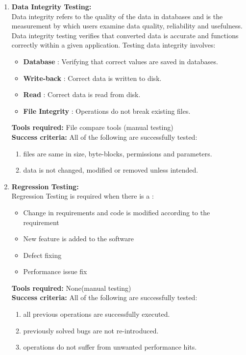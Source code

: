 \begin{enumerate}
\item \textbf{Data Integrity Testing:} \\
Data integrity refers to the quality of the data in databases and is the measurement by which users examine data quality, reliability and usefulness. Data integrity testing verifies that converted data is accurate and functions correctly within a given application. Testing data integrity involves:
\begin{itemize}
\item \textbf{Database} : Verifying that correct values are saved in databases.
\item \textbf{Write-back} : Correct data is written to disk.
\item \textbf{Read} : Correct data is read from disk.
\item \textbf{File Integrity} : Operations do not break existing files.
\end{itemize}
\textbf{Tools required:} File compare tools (manual testing) \\
\textbf{Success criteria:} All of the following are successfully tested:
\begin{enumerate}
\item files are same in size, byte-blocks, permissions and parameters.
\item data is not changed, modified or removed unless intended.
\end{enumerate}

\item \textbf{Regression Testing:} \\
Regression Testing is required when there is a :
\begin{itemize}
\item Change in requirements and code is modified according to the requirement
\item New feature is added to the software
\item Defect fixing
\item Performance issue fix 
\end{itemize}
\textbf{Tools required:} None(manual testing) \\
\textbf{Success criteria:} All of the following are successfully tested:
\begin{enumerate}
\item all previous operations are successfully executed.
\item previously solved bugs are not re-introduced.
\item operations do not suffer from unwanted performance hits.
\end{enumerate}


\end{enumerate}
